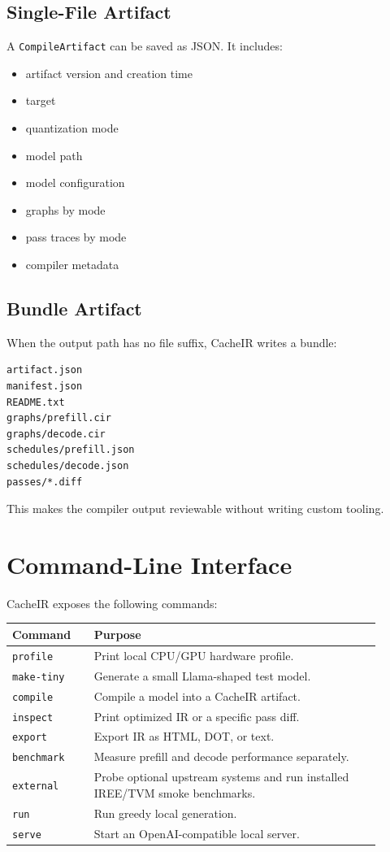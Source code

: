 \documentclass[11pt]{article}
\begin{document}
\subsection{Single-File Artifact}

A \texttt{CompileArtifact} can be saved as JSON. It includes:

\begin{itemize}[leftmargin=*]
  \item artifact version and creation time
  \item target
  \item quantization mode
  \item model path
  \item model configuration
  \item graphs by mode
  \item pass traces by mode
  \item compiler metadata
\end{itemize}

\subsection{Bundle Artifact}

When the output path has no file suffix, CacheIR writes a bundle:

\begin{lstlisting}
artifact.json
manifest.json
README.txt
graphs/prefill.cir
graphs/decode.cir
schedules/prefill.json
schedules/decode.json
passes/*.diff
\end{lstlisting}

This makes the compiler output reviewable without writing custom tooling.

\section{Command-Line Interface}

CacheIR exposes the following commands:

\begin{longtable}{p{0.20\linewidth}p{0.70\linewidth}}
\toprule
\textbf{Command} & \textbf{Purpose} \\
\midrule
\texttt{profile} & Print local CPU/GPU hardware profile. \\
\texttt{make-tiny} & Generate a small Llama-shaped test model. \\
\texttt{compile} & Compile a model into a CacheIR artifact. \\
\texttt{inspect} & Print optimized IR or a specific pass diff. \\
\texttt{export} & Export IR as HTML, DOT, or text. \\
\texttt{benchmark} & Measure prefill and decode performance separately. \\
\texttt{external} & Probe optional upstream systems and run installed IREE/TVM
smoke benchmarks. \\
\texttt{run} & Run greedy local generation. \\
\texttt{serve} & Start an OpenAI-compatible local server. \\
\bottomrule
\end{longtable}
\end{document}
